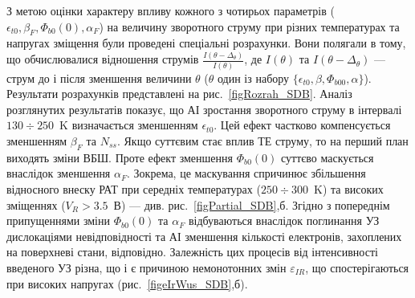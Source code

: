 З метою оцінки характеру впливу  кожного з чотирьох параметрів ($\epsilon_{t0}, \beta_F, \Phi_{b0}(0), \alpha_F$) на величину зворотного струму при
різних температурах та напругах зміщення були проведені спеціальні розрахунки.
Вони полягали в тому, що обчислювалися відношення струмів
$\frac{I(\theta-\Delta_\theta)}{I(\theta)}$,
де $I(\theta)$ та $I(\theta-\Delta_\theta)$ --- струм до і після зменшення величини $\theta$ ($\theta$ один із набору $\{\epsilon_{t0}, \beta, \Phi_{b00}, \alpha\}$).
Результати розрахунків представлені на рис.~\ref{figRozrah_SDB}.
Аналіз розглянутих результатів показує, що АІ зростання зворотного струму в інтервалі $130\div250$~K визначається зменшенням $\epsilon_{t0}$.
Цей ефект частково компенсується зменшенням $\beta_F$ та $N_{ss}$.
Якщо суттєвим стає вплив ТЕ струму, то на перший план виходять зміни ВБШ.
Проте ефект зменшення $\Phi_{b0}(0)$ суттєво маскується внаслідок зменшення $\alpha_F$.
Зокрема, це маскування спричинює збільшення відносного внеску РАТ при середніх температурах ($250\div300$~K) та високих зміщеннях ($V_R>3.5$~В) --- див. рис.~\ref{figPartial_SDB},б.
Згідно з попереднім  припущеннями зміни $\Phi_{b0}(0)$ та $\alpha_F$ відбуваються внаслідок поглинання УЗ дислокаціями
невідповідності та АІ зменшення кількості електронів, захоплених на поверхневі стани, відповідно.
Залежність цих процесів від інтенсивності введеного УЗ різна,
що і є причиною немонотонних змін $\varepsilon_{IR}$, що спостерігаються при високих напругах (рис.~\ref{figeIrWus_SDB},б).



